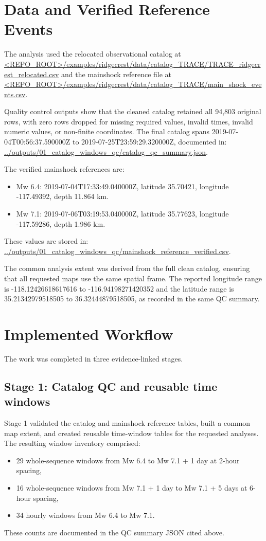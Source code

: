 \documentclass[11pt]{article}
\begin{document}
\section{Data and Verified Reference Events}
The analysis used the relocated observational catalog at
\url{<REPO_ROOT>/examples/ridgecrest/data/catalog_TRACE/TRACE_ridgecrest_relocated.csv}
and the mainshock reference file at
\url{<REPO_ROOT>/examples/ridgecrest/data/catalog_TRACE/main_shock_events.csv}.

Quality control outputs show that the cleaned catalog retained all 94{,}803 original rows, with zero rows dropped for missing required values, invalid times, invalid numeric values, or non-finite coordinates. The final catalog spans 2019-07-04T00:56:37.590000Z to 2019-07-25T23:59:29.320000Z, documented in:
\url{../outputs/01_catalog_windows_qc/catalog_qc_summary.json}.

The verified mainshock references are:
\begin{itemize}[leftmargin=1.5em]
    \item Mw 6.4: 2019-07-04T17:33:49.040000Z, latitude 35.70421, longitude -117.49392, depth 11.864 km.
    \item Mw 7.1: 2019-07-06T03:19:53.040000Z, latitude 35.77623, longitude -117.59286, depth 1.986 km.
\end{itemize}
These values are stored in:
\url{../outputs/01_catalog_windows_qc/mainshock_reference_verified.csv}.

The common analysis extent was derived from the full clean catalog, ensuring that all requested maps use the same spatial frame. The reported longitude range is -118.12426618617616 to -116.94198271420352 and the latitude range is 35.21342979518505 to 36.32444879518505, as recorded in the same QC summary.

\section{Implemented Workflow}
The work was completed in three evidence-linked stages.

\subsection{Stage 1: Catalog QC and reusable time windows}
Stage 1 validated the catalog and mainshock reference tables, built a common map extent, and created reusable time-window tables for the requested analyses. The resulting window inventory comprised:
\begin{itemize}[leftmargin=1.5em]
    \item 29 whole-sequence windows from Mw 6.4 to Mw 7.1 + 1 day at 2-hour spacing,
    \item 16 whole-sequence windows from Mw 7.1 + 1 day to Mw 7.1 + 5 days at 6-hour spacing,
    \item 34 hourly windows from Mw 6.4 to Mw 7.1.
\end{itemize}
These counts are documented in the QC summary JSON cited above.
\end{document}
